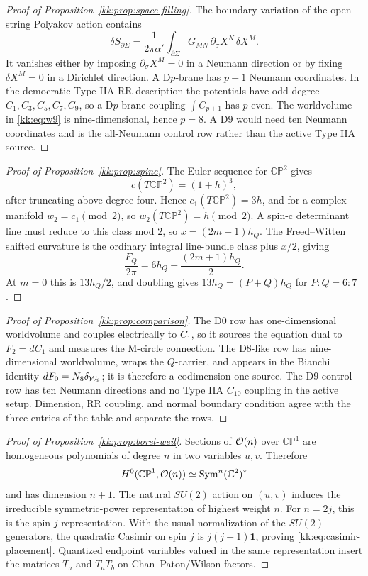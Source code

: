 \documentclass[11pt]{article}
\newcommand{\CP}{\mathbb{CP}}
\newcommand{\CC}{\mathbb{C}}
\theoremstyle{plain}
\theoremstyle{definition}
\begin{document}
\begin{proof}[Proof of Proposition~\ref{kk:prop:space-filling}]
The boundary variation of the open-string Polyakov action contains
\[
  \delta S_{\partial\Sigma}
  =\frac{1}{2\pi\alpha'}\int_{\partial\Sigma}
  G_{MN}\,\partial_\sigma X^N\,\delta X^M .
\]
It vanishes either by imposing \(\partial_\sigma X^M=0\) in a Neumann direction
or by fixing \(\delta X^M=0\) in a Dirichlet direction.  A D\(p\)-brane has
\(p+1\) Neumann coordinates.  In the democratic Type IIA RR description the
potentials have odd degree \(C_1,C_3,C_5,C_7,C_9\), so a D\(p\)-brane coupling
\(\int C_{p+1}\) has \(p\) even.  The worldvolume in \eqref{kk:eq:w9} is
nine-dimensional, hence \(p=8\).  A D9 would need ten Neumann coordinates and is
the all-Neumann control row rather than the active Type IIA source.
\end{proof}

\begin{proof}[Proof of Proposition~\ref{kk:prop:spinc}]
The Euler sequence for \(\CP^2\) gives
\[
  c(T\CP^2)=(1+h)^3 ,
\]
after truncating above degree four.  Hence \(c_1(T\CP^2)=3h\), and for a
complex manifold \(w_2=c_1\pmod 2\), so \(w_2(T\CP^2)=h\pmod 2\).  A spin-c
determinant line must reduce to this class mod \(2\), so
\(x=(2m+1)h_Q\).  The Freed--Witten shifted curvature is the ordinary integral
line-bundle class plus \(x/2\), giving
\[
  \frac{F_Q}{2\pi}=6h_Q+\frac{(2m+1)h_Q}{2}.
\]
At \(m=0\) this is \(13h_Q/2\), and doubling gives \(13h_Q=(P+Q)h_Q\) for
\(P:Q=6:7\).
\end{proof}

\begin{proof}[Proof of Proposition~\ref{kk:prop:comparison}]
The D0 row has one-dimensional worldvolume and couples electrically to \(C_1\),
so it sources the equation dual to \(F_2=dC_1\) and measures the M-circle
connection.  The D8-like row has nine-dimensional worldvolume, wraps the
\(Q\)-carrier, and appears in the Bianchi identity \(dF_0=N_8\delta_{{\cal W}_9}\);
it is therefore a codimension-one source.  The D9 control row has ten Neumann
directions and no Type IIA \(C_{10}\) coupling in the active setup.  Dimension,
RR coupling, and normal boundary condition agree with the three entries of the
table and separate the rows.
\end{proof}

\begin{proof}[Proof of Proposition~\ref{kk:prop:borel-weil}]
Sections of \({\cal O}(n)\) over \(\CP^1\) are homogeneous polynomials of
degree \(n\) in two variables \(u,v\).  Therefore
\[
  H^0(\CP^1,{\cal O}(n))\simeq {\rm Sym}^n(\CC^2)^*
\]
and has dimension \(n+1\).  The natural \(SU(2)\) action on \((u,v)\) induces
the irreducible symmetric-power representation of highest weight \(n\).  For
\(n=2j\), this is the spin-\(j\) representation.  With the usual normalization
of the \(SU(2)\) generators, the quadratic Casimir on spin \(j\) is
\(j(j+1)\mathbf{1}\), proving \eqref{kk:eq:casimir-placement}.  Quantized endpoint
variables valued in the same representation insert the matrices \(T_a\) and
\(T_aT_b\) on Chan--Paton/Wilson factors.
\end{proof}
\end{document}
